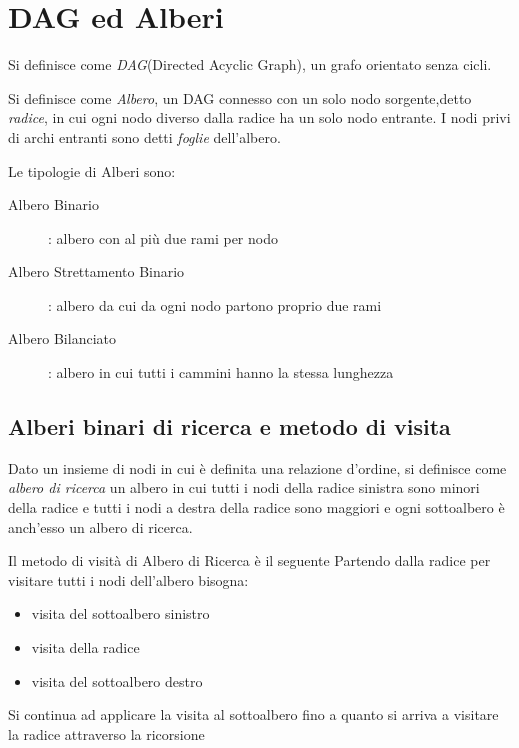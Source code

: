 \section{DAG ed Alberi}
Si definisce come \emph{DAG}(Directed Acyclic Graph), un grafo orientato senza cicli.

Si definisce come \emph{Albero}, un DAG connesso con un solo nodo sorgente,detto \emph{radice},
in cui ogni nodo diverso dalla radice ha un solo nodo entrante.\newline
I nodi privi di archi entranti sono detti \emph{foglie} dell'albero.


Le tipologie di Alberi sono:
\begin{description}
    \item[Albero Binario]: albero con al più due rami per nodo 
    \item[Albero Strettamento Binario]: albero da cui da ogni nodo partono proprio due rami 
    \item[Albero Bilanciato]: albero in cui tutti i cammini hanno la stessa lunghezza
\end{description}


\subsection{Alberi binari di ricerca e metodo di visita}
Dato un insieme di nodi in cui è definita una relazione d'ordine, si definisce come
\emph{albero di ricerca} un albero in cui tutti i nodi della radice sinistra sono
minori della radice e tutti i nodi a destra della radice sono maggiori e ogni sottoalbero
è anch'esso un albero di ricerca.


Il metodo di visità di Albero di Ricerca è il seguente
Partendo dalla radice per visitare tutti i nodi dell'albero bisogna:
\begin{itemize}
    \item visita del sottoalbero sinistro
    \item visita della radice
    \item visita del sottoalbero destro
\end{itemize}
Si continua ad applicare la visita al sottoalbero fino a quanto si arriva a visitare la radice
attraverso la ricorsione

